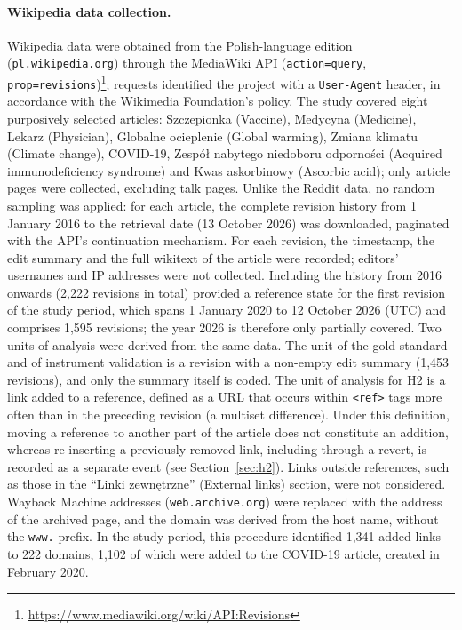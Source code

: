 \documentclass[10pt,a4paper]{article}
\newcommand{\kod}[1]{\texttt{#1}}
\begin{document}
\paragraph{Wikipedia data collection.}
Wikipedia data were obtained from the Polish-language edition (\kod{pl.wikipedia.org})
through the MediaWiki API (\kod{action=query},
\kod{prop=revisions})\footnote{\url{https://www.mediawiki.org/wiki/API:Revisions}};
requests identified the project with a \kod{User-Agent} header, in accordance with the
Wikimedia Foundation's policy. The study covered eight purposively selected articles:
Szczepionka (Vaccine), Medycyna (Medicine), Lekarz (Physician), Globalne ocieplenie
(Global warming), Zmiana klimatu (Climate change), COVID-19, Zespół nabytego niedoboru
odporności (Acquired immunodeficiency syndrome) and Kwas askorbinowy (Ascorbic acid); only
article pages were collected, excluding talk pages.
Unlike the Reddit data, no random sampling was applied: for each article, the complete
revision history from 1 January 2016 to the retrieval date (13 October 2026) was
downloaded, paginated with the API's continuation mechanism. For each revision, the
timestamp, the edit summary and the full wikitext of the article were recorded; editors'
usernames and IP addresses were not collected. Including the history from 2016 onwards
(2,222 revisions in total) provided a reference state for the first revision of the study
period, which spans 1 January 2020 to 12 October 2026 (UTC) and comprises 1,595
revisions; the year 2026 is therefore only partially covered. Two units of analysis were
derived from the same data. The unit of the gold standard and of instrument validation is
a revision with a non-empty edit summary (1,453 revisions), and only the
summary itself is coded. The unit of analysis for H2 is a link added to a reference,
defined as a URL that occurs within \kod{<ref>} tags more often than in the preceding
revision (a multiset difference). Under this definition, moving a reference to another
part of the article does not constitute an addition, whereas re-inserting a previously
removed link, including through a revert, is recorded as a separate event (see
Section~\ref{sec:h2}). Links outside references, such as those in the ``Linki
zewnętrzne'' (External links) section, were not considered. Wayback Machine addresses
(\kod{web.archive.org}) were replaced with the address of the archived page, and the
domain was derived from the host name, without the \kod{www.} prefix. In the study
period, this procedure identified 1,341 added links to 222 domains, 1,102 of
which were added to the COVID-19 article, created in February 2020.
\end{document}
